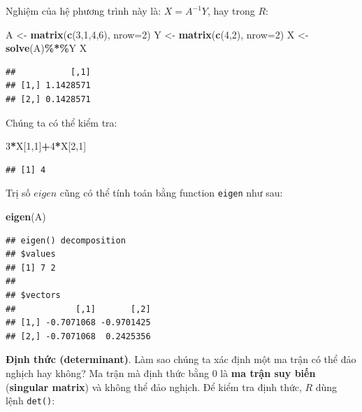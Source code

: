 \documentclass[
]{book}
\newenvironment{Shaded}{\begin{snugshade}}{\end{snugshade}}
\newcommand{\DataTypeTok}[1]{\textcolor[rgb]{0.13,0.29,0.53}{#1}}
\newcommand{\DecValTok}[1]{\textcolor[rgb]{0.00,0.00,0.81}{#1}}
\newcommand{\KeywordTok}[1]{\textcolor[rgb]{0.13,0.29,0.53}{\textbf{#1}}}
\newcommand{\NormalTok}[1]{#1}
\newcommand{\OperatorTok}[1]{\textcolor[rgb]{0.81,0.36,0.00}{\textbf{#1}}}
\newcommand{\StringTok}[1]{\textcolor[rgb]{0.31,0.60,0.02}{#1}}
\begin{document}
Nghiệm của hệ phương trình này là: \(X = A^{-1}Y\), hay trong \(R\):

\begin{Shaded}
\begin{Highlighting}[]
\NormalTok{A \textless{}{-}}\StringTok{ }\KeywordTok{matrix}\NormalTok{(}\KeywordTok{c}\NormalTok{(}\DecValTok{3}\NormalTok{,}\DecValTok{1}\NormalTok{,}\DecValTok{4}\NormalTok{,}\DecValTok{6}\NormalTok{), }\DataTypeTok{nrow=}\DecValTok{2}\NormalTok{)}
\NormalTok{Y \textless{}{-}}\StringTok{ }\KeywordTok{matrix}\NormalTok{(}\KeywordTok{c}\NormalTok{(}\DecValTok{4}\NormalTok{,}\DecValTok{2}\NormalTok{), }\DataTypeTok{nrow=}\DecValTok{2}\NormalTok{)}
\NormalTok{X \textless{}{-}}\StringTok{ }\KeywordTok{solve}\NormalTok{(A)}\OperatorTok{\%*\%}\NormalTok{Y}
\NormalTok{X}
\end{Highlighting}
\end{Shaded}

\begin{verbatim}
##           [,1]
## [1,] 1.1428571
## [2,] 0.1428571
\end{verbatim}

Chúng ta có thể kiểm tra:

\begin{Shaded}
\begin{Highlighting}[]
\DecValTok{3}\OperatorTok{*}\NormalTok{X[}\DecValTok{1}\NormalTok{,}\DecValTok{1}\NormalTok{]}\OperatorTok{+}\DecValTok{4}\OperatorTok{*}\NormalTok{X[}\DecValTok{2}\NormalTok{,}\DecValTok{1}\NormalTok{]}
\end{Highlighting}
\end{Shaded}

\begin{verbatim}
## [1] 4
\end{verbatim}

Trị số \(eigen\) cũng có thể tính toán bằng function \texttt{eigen} như sau:

\begin{Shaded}
\begin{Highlighting}[]
\KeywordTok{eigen}\NormalTok{(A)}
\end{Highlighting}
\end{Shaded}

\begin{verbatim}
## eigen() decomposition
## $values
## [1] 7 2
## 
## $vectors
##            [,1]       [,2]
## [1,] -0.7071068 -0.9701425
## [2,] -0.7071068  0.2425356
\end{verbatim}

\textbf{Định thức (determinant)}. Làm sao chúng ta xác định một ma trận có thể đảo nghịch hay không? Ma trận mà định thức bằng 0 là \textbf{ma trận suy biến} (\textbf{singular matrix}) và không thể đảo nghịch. Để kiểm tra định thức, \(R\) dùng lệnh \texttt{det()}:
\end{document}

